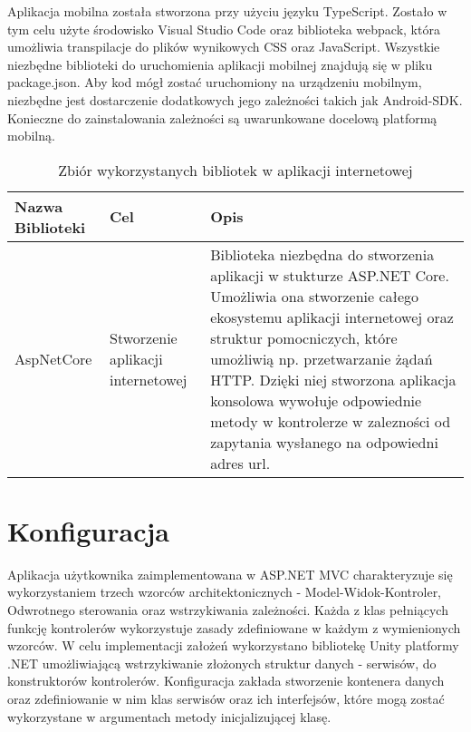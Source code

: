 Aplikacja mobilna została stworzona przy użyciu języku TypeScript. Zostało w tym celu użyte środowisko Visual Studio Code oraz biblioteka webpack, która umożliwia transpilacje do plików wynikowych CSS oraz JavaScript. Wszystkie niezbędne biblioteki do uruchomienia aplikacji mobilnej znajdują się w pliku package.json. Aby kod mógł zostać uruchomiony na urządzeniu mobilnym, niezbędne jest dostarczenie dodatkowych jego zależności takich jak Android-SDK. Konieczne do zainstalowania zależności są uwarunkowane docelową platformą mobilną.


\begin{center}
	\begin{longtable}{ | p{3.1cm} | p{4cm} | p{6.5cm} |}
		\caption{Zbiór wykorzystanych bibliotek w aplikacji internetowej}
		\label{librariesPython} \\
		\hline Nazwa \newline Biblioteki & Cel & Opis \\ \hline    
		
		\hline AspNetCore &
		Stworzenie aplikacji internetowej
		
		& Biblioteka niezbędna do stworzenia aplikacji w stukturze ASP.NET Core. Umożliwia ona stworzenie całego ekosystemu aplikacji internetowej oraz struktur pomocniczych, które umożliwią np. przetwarzanie żądań HTTP. Dzięki niej stworzona aplikacja konsolowa wywołuje odpowiednie metody w kontrolerze w zalezności od zapytania wysłanego na odpowiedni adres url.\\ \hline
	\end{longtable}
\end{center}

\section{Konfiguracja}
Aplikacja użytkownika zaimplementowana w ASP.NET MVC charakteryzuje się wykorzystaniem trzech wzorców architektonicznych - Model-Widok-Kontroler, Odwrotnego sterowania oraz wstrzykiwania zależności. Każda z klas pełniących funkcję kontrolerów wykorzystuje zasady zdefiniowane w każdym z wymienionych wzorców. W celu implementacji założeń wykorzystano bibliotekę Unity platformy .NET umożliwiającą wstrzykiwanie złożonych struktur danych - serwisów, do konstruktorów kontrolerów. Konfiguracja zakłada stworzenie kontenera danych oraz zdefiniowanie w nim klas serwisów oraz ich interfejsów, które mogą zostać wykorzystane w argumentach metody inicjalizującej klasę.
\\

